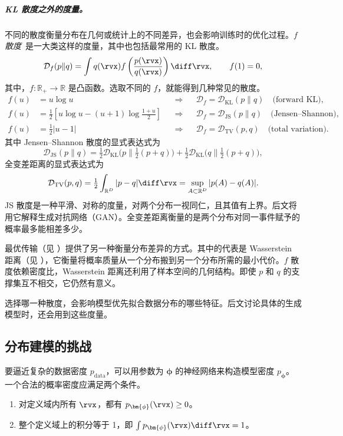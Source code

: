\subparagraph{KL 散度之外的度量。} 不同的散度衡量分布在几何或统计上的不同差异，也会影响训练时的优化过程。\emph{$f$ 散度}~\citep{csiszar1963informationstheoretische}是一大类这样的度量，其中也包括最常用的 KL 散度。
\begin{align}\label{eq:f-div}
    \mathcal{D}_f(p\|q)
=\int q(\rvx) f \left(\frac{p(\rvx)}{q(\rvx)}\right)\diff \rvx,
\qquad f(1)=0,
\end{align}
其中，$f:\mathbb{R}_+ \to\mathbb{R}$ 是凸函数。选取不同的 $f$，就能得到几种常见的散度。
\[
\begin{aligned}
f(u)&=u\log u &&\Rightarrow&& \mathcal{D}_f=\mathcal{D}_{\mathrm{KL}}(p\|q)\quad\text{(forward KL)},\\
f(u)&=\tfrac12 \left[u\log u-(u+1)\log \tfrac{1+u}{2}\right] &&\Rightarrow&& \mathcal{D}_f=\mathcal{D}_{\mathrm{JS}}(p\|q)\quad\text{(Jensen--Shannon)},\\
f(u)&=\tfrac12|u-1| &&\Rightarrow&& \mathcal{D}_f=\mathcal{D}_{\mathrm{TV}}(p,q)\quad\text{(total variation)}.
\end{aligned}
\]
其中 Jensen--Shannon 散度的显式表达式为
\[
\mathcal{D}_{\mathrm{JS}}(p\|q)=\tfrac12 \mathcal{D}_{\mathrm{KL}}\big(p\| \tfrac12(p+q)\big)+\tfrac12 \mathcal{D}_{\mathrm{KL}}\big(q\| \tfrac12(p+q)\big),
\]
全变差距离的显式表达式为
\[
\mathcal{D}_{\mathrm{TV}}(p,q)=\tfrac12 \int_{\mathbb{R}^D
} |p-q|\diff \rvx
=\sup_{A\subset \mathbb{R}^D } |p(A)-q(A)|.
\]
JS 散度是一种平滑、对称的度量，对两个分布一视同仁，且其值有上界。后文将用它解释生成对抗网络（GAN）。全变差距离衡量的是两个分布对同一事件赋予的概率最多能相差多少。


最优传输（见 ）提供了另一种衡量分布差异的方式。其中的代表是 Wasserstein 距离（见 ），它衡量将概率质量从一个分布搬到另一个分布所需的最小代价。$f$ 散度依赖密度比，Wasserstein 距离还利用了样本空间的几何结构。即使 $p$ 和 $q$ 的支撑集互不相交，它仍然有意义。

选择哪一种散度，会影响模型优先拟合数据分布的哪些特征。后文讨论具体的生成模型时，还会用到这些度量。


\subsection{分布建模的挑战}


要逼近复杂的数据密度 $p_{\mathrm{data}}$，可以用参数为 $\bm{\phi}$ 的神经网络来构造模型密度 $p_{\bm{\phi}}$。一个合法的概率密度应满足两个条件。
\begin{enumerate}
    \item[(i)]  对定义域内所有 $\rvx$，都有 $p_{\bm{\phi}}(\rvx) \ge 0$。
    \item[(ii)]  整个定义域上的积分等于 1，即 $\int p_{\bm{\phi}}(\rvx) \diff \rvx = 1$。
\end{enumerate}

